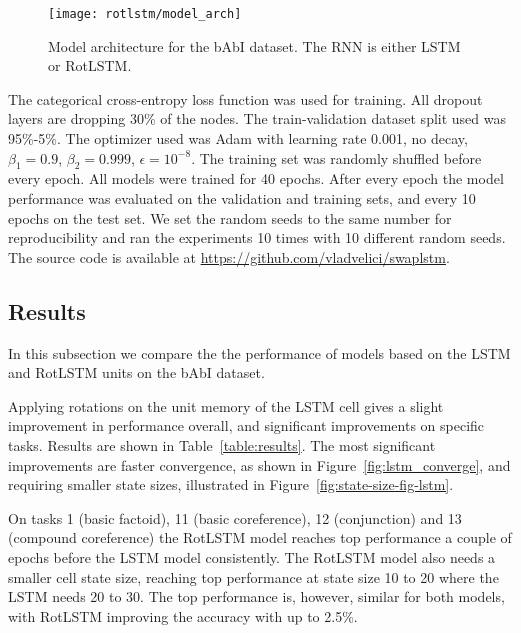 \documentclass{article}
\begin{document}
\begin{figure}[ht]
	\begin{center}
		\texttt{[image: rotlstm/model\_arch]}
	\end{center}
	\caption[Model architecture for RotLSTM experiments]{Model architecture for the bAbI dataset. The RNN is either LSTM or RotLSTM.}
	\label{fig:model_arch}
\end{figure}

The categorical cross-entropy loss function was used for training. All dropout layers are dropping 30\% of the nodes. The train-validation dataset split used was 95\%-5\%. The optimizer used was Adam with learning rate 0.001, no decay, $\beta_1=0.9$, $\beta_2=0.999$, $\epsilon = 10^{-8}$. The training set was randomly shuffled before every epoch. All models were trained for 40 epochs. After every epoch the model performance was evaluated on the validation and training sets, and every 10 epochs on the test set. We set the random seeds to the same number for reproducibility and ran the experiments 10 times with 10 different random seeds. The source code is available at \url{https://github.com/vladvelici/swaplstm}.

\subsection{Results}

In this subsection we compare the the performance of models based on the LSTM and RotLSTM units on the bAbI dataset.



Applying rotations on the unit memory of the LSTM cell gives a slight improvement in performance overall, and significant improvements on specific tasks. Results are shown in Table~\ref{table:results}. The most significant improvements are faster convergence, as shown in Figure~\ref{fig:lstm_converge}, and requiring smaller state sizes, illustrated in Figure~\ref{fig:state-size-fig-lstm}.

On tasks 1 (basic factoid), 11 (basic coreference), 12 (conjunction) and 13 (compound coreference) the RotLSTM model reaches top performance a couple of epochs before the LSTM model consistently. The RotLSTM model also needs a smaller cell state size, reaching top performance at state size 10 to 20 where the LSTM needs 20 to 30. The top performance is, however, similar for both models, with RotLSTM improving the accuracy with up to 2.5\%.
\end{document}
